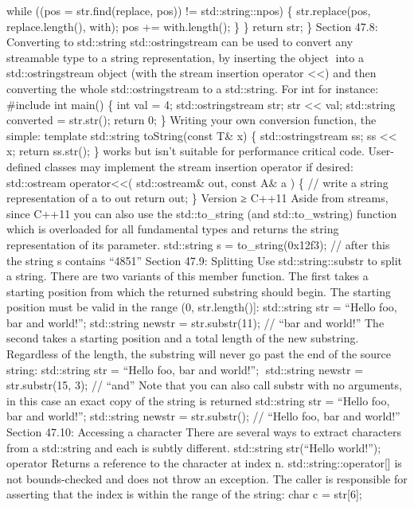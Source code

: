 while ((pos = str.find(replace, pos)) != std::string::npos) \{
str.replace(pos, replace.length(), with); pos += with.length(); \} \}
return str; \} Section 47.8: Converting to std::string
std::ostringstream can be used to convert any streamable type to a
string representation, by inserting the object into a
std::ostringstream object (with the stream insertion operator
\textless\textless) and then converting the whole std::ostringstream to
a std::string. For int for instance: \#include int main() \{ int val =
4; std::ostringstream str; str \textless\textless{} val; std::string
converted = str.str(); return 0; \} Writing your own conversion
function, the simple: template std::string toString(const T\& x) \{
std::ostringstream ss; ss \textless\textless{} x; return ss.str(); \}
works but isn't suitable for performance critical code. User-deﬁned
classes may implement the stream insertion operator if desired:
std::ostream operator\textless\textless( std::ostream\& out, const A\& a
) \{ // write a string representation of a to out return out; \} Version
≥ C++11 Aside from streams, since C++11 you can also use the
std::to\_string (and std::to\_wstring) function which is overloaded for
all fundamental types and returns the string representation of its
parameter. std::string s = to\_string(0x12f3); // after this the string
s contains ``4851'' Section 47.9: Splitting Use std::string::substr to
split a string. There are two variants of this member function. The ﬁrst
takes a starting position from which the returned substring should
begin. The starting position must be valid in the range (0,
str.length(){]}: std::string str = ``Hello foo, bar and world!'';
std::string newstr = str.substr(11); // ``bar and world!'' The second
takes a starting position and a total length of the new substring.
Regardless of the length, the substring will never go past the end of
the source string: std::string str = ``Hello foo, bar and world!'';
std::string newstr = str.substr(15, 3); // ``and'' Note that you can
also call substr with no arguments, in this case an exact copy of the
string is returned std::string str = ``Hello foo, bar and world!'';
std::string newstr = str.substr(); // ``Hello foo, bar and world!''
Section 47.10: Accessing a character There are several ways to extract
characters from a std::string and each is subtly diﬀerent. std::string
str(``Hello world!''); operator\href{n}{} Returns a reference to the
character at index n. std::string::operator{[}{]} is not bounds-checked
and does not throw an exception. The caller is responsible for asserting
that the index is within the range of the string: char c = str{[}6{]};
